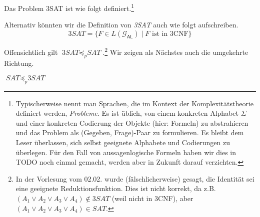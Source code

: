 \begin{Def}[name={[\textit{3SAT}]}]
Das Problem 3SAT ist wie folgt definiert.\footnote{
Typischerweise nennt man Sprachen, die im Kontext der Komplexitätstheorie definiert werden, \emph{Probleme}.
Es ist üblich, von einem konkreten Alphabet $\Sigma$ und einer konkreten Codierung der Objekte (hier: Formeln) zu abstrahieren und das Problem als (Gegeben, Frage)-Paar zu formulieren.
Es bleibt dem Leser überlassen, sich selbst geeignete Alphabete und Codierungen zu überlegen.
Für den Fall von aussagenlogische Formeln haben wir dies in TODO noch einmal gemacht, werden aber in Zukunft darauf verzichten.}
\begin{center}
\end{center}
	
\end{Def}
Alternativ könnten wir die Definition von \textit{3SAT} auch wie folgt aufschreiben.
$$\textit{3SAT} = \{F\in L(\mathcal{G}_\mathsf{AL})\mid F \text{ ist in 3CNF}\}$$

Offensichtlich gilt $\textit{3SAT} \preceq_p \textit{SAT}$.\footnote{
In der Vorlesung vom 02.02. wurde (fälschlicherweise) gesagt, die Identität sei eine geeignete Reduktionsfunktion.
Dies ist nicht korrekt, da z.B. 
$(A_1\lor A_2\lor A_3\lor A_4)\notin \textit{3SAT}$
(weil nicht in 3CNF), aber $(A_1\lor A_2\lor A_3\lor A_4)\in \textit{SAT}$.
} Wir zeigen als Nächstes auch die umgekehrte Richtung.

\begin{lemma}\label{lem:sat3sat}
	$\textit{SAT} \preceq_p \textit{3SAT}$
\end{lemma}


